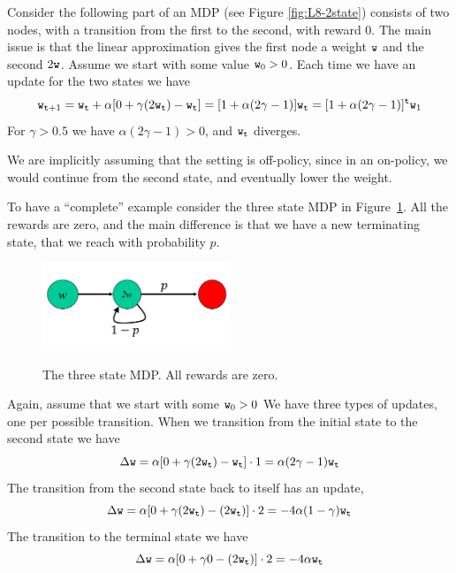 Consider the following part of an MDP (see Figure
\ref{fig:L8-2state}) consists of two nodes, with a transition from
the first to the second, with reward $0$. The main issue is that the
linear approximation gives the first node a weight ${\tt w}$ and the
second $2{\tt w}$. Assume we start with some value ${\tt w}_0>0$.
Each time we have an update for the two states we have
\[
{\tt w}_{{\tt t}+1}={\tt w}_{\tt t} +\alpha[0+\gamma
(2{\tt w}_{\tt t})-{\tt w}_{\tt t}]=[1+\alpha(2\gamma-1)]{\tt w}_{\tt t}=[1+\alpha(2\gamma-1)]^{\tt t}{\tt w}_1
\]
For $\gamma>0.5$ we have $\alpha(2\gamma-1)>0$, and ${\tt w}_{\tt t}$
diverges.

We are implicitly assuming that the setting is off-policy, since in
an on-policy, we would continue from the second state, and
eventually lower the weight.

To have a ``complete'' example consider the three state MDP in
Figure~\ref{fig:L8-3state}. All the rewards are zero, and the main
difference is that we have a new terminating state, that we reach
with probability $p$.

\begin{figure}
  \begin{centering}
  \includegraphics[width=0.5\textwidth]{figures/L8-3state.png}\\
  \caption{The three state MDP. All rewards are zero.}\label{fig:L8-3state}
  \end{centering}
\end{figure}




Again, assume that we start with some ${\tt w}_0>0$ We have three
types of updates, one per possible transition. When we transition
from the initial state to the second state we have
\[
\Delta {\tt w}= \alpha[0+\gamma
(2{\tt w}_{\tt t})-{\tt w}_{\tt t}]\cdot
1=\alpha(2\gamma-1){\tt w}_{\tt t}
\]
The transition from the second state back to itself has an update,
\[
\Delta {\tt w}= \alpha[0+\gamma
(2{\tt w}_{\tt t})-(2{\tt w}_{\tt t})]\cdot 2
=-4\alpha(1-\gamma){\tt w}_{\tt t}
\]
The transition to the terminal state we have
\[
\Delta {\tt w}= \alpha[0+\gamma 0 -(2{\tt w}_{\tt t})]\cdot
2=-4\alpha {\tt w}_{\tt t}
\]



